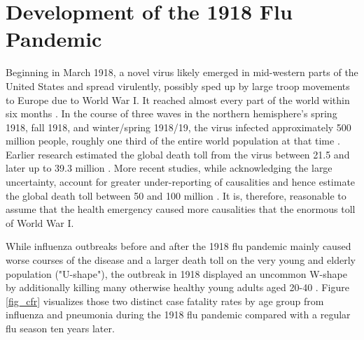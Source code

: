 \documentclass[12pt,a4paper]{article}
\begin{document}
\section{Development of the 1918 Flu Pandemic}


Beginning in March 1918, a novel virus likely emerged in mid-western parts of the United States \citep{barrySiteOrigin19182004} and spread virulently, possibly sped up by large troop movements to Europe due to World War I.
It reached almost every part of the world within six months \citep{pattersonGeographyMortality19181991}.
In the course of three waves in the northern hemisphere's spring 1918, fall 1918, and winter/spring 1918/19, the virus infected approximately 500 million people, roughly one third of the entire world population at that time \citep{taubenberger1918InfluenzaMother2006}.
Earlier research estimated the global death toll from the virus between 21.5 \citep{jordanEpidemicInfluenzaSurvey1927} and later up to 39.3 million \citep{pattersonGeographyMortality19181991}.
More recent studies, while acknowledging the large uncertainty, account for greater under-reporting of causalities and hence estimate the global death toll between 50 and 100 million \citep{johnsonUpdatingAccountsGlobal2002}.
It is, therefore, reasonable to assume that the health emergency caused more causalities that the enormous toll of World War I.

While influenza outbreaks before and after the 1918 flu pandemic mainly caused worse courses of the disease and a larger death toll on the very young and elderly population ("U-shape"),
the outbreak in 1918 displayed an uncommon W-shape by additionally killing many otherwise healthy young adults aged 20-40 \citep{taubenberger1918InfluenzaMother2006}.
Figure \ref{fig_cfr} visualizes those two distinct case fatality rates by age group from influenza and pneumonia during the 1918 flu pandemic compared with a regular flu season ten years later.
\end{document}
